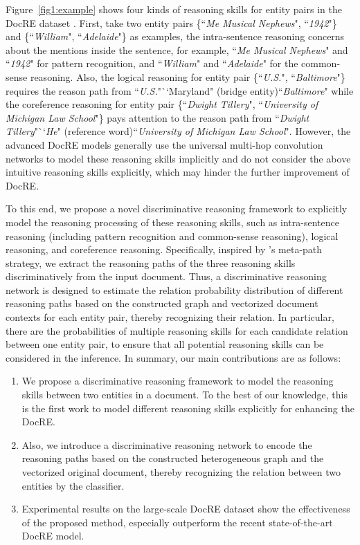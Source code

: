 \documentclass[11pt,a4paper]{article}
\begin{document}
Figure~\ref{fig1:example} shows four kinds of reasoning skills for entity pairs in the DocRE dataset \cite{yao-etal-2019-docred}.
First, take two entity pairs \{``\textit{Me Musical Nephews}", ``\textit{1942}"\} and \{``\textit{William}", ``\textit{Adelaide}"\} as examples, the intra-sentence reasoning concerns about the mentions inside the sentence, for example, ``\textit{Me Musical Nephews}" and ``\textit{1942}" for pattern recognition, and ``\textit{William}" and ``\textit{Adelaide}" for the common-sense reasoning.
Also, the logical reasoning for entity pair \{``\textit{U.S.}", ``\textit{Baltimore}"\} requires the reason path from ``\textit{U.S.}"``Maryland" (bridge entity)``\textit{Baltimore}" while the coreference reasoning for entity pair \{``\textit{Dwight Tillery}", ``\textit{University of Michigan Law School}"\} pays attention to the reason path from ``\textit{Dwight Tillery}"``\textit{He}" (reference word)``\textit{University of Michigan Law School}".
However, the advanced DocRE models generally use the universal multi-hop convolution networks to model these reasoning skills implicitly and do not consider the above intuitive reasoning skills explicitly, which may hinder the further improvement of DocRE.

To this end, we propose a novel discriminative reasoning framework to explicitly model the reasoning processing of these reasoning skills, such as intra-sentence reasoning (including pattern recognition and common-sense reasoning), logical reasoning, and coreference reasoning.
Specifically, inspired by \citeauthor{docred-rec}'s meta-path strategy, we extract the reasoning paths of the three reasoning skills discriminatively from the input document.
Thus, a discriminative reasoning network is designed to estimate the relation probability distribution of different reasoning paths based on the constructed graph and vectorized document contexts for each entity pair, thereby recognizing their relation.
In particular, there are the probabilities of multiple reasoning skills for each candidate relation between one entity pair, to ensure that all potential reasoning skills can be considered in the inference.
In summary, our main contributions are as follows:
\begin{enumerate}
\item[] 
We propose a discriminative reasoning framework to model the reasoning skills between two entities in a document. 
To the best of our knowledge, this is the first work to model different reasoning skills explicitly for enhancing the DocRE.
\item[]
Also, we introduce a discriminative reasoning network to encode the reasoning paths based on the constructed heterogeneous graph and the vectorized original document, thereby recognizing the relation between two entities by the classifier.
\item[]
Experimental results on the large-scale DocRE dataset show the effectiveness of the proposed method, especially outperform the recent state-of-the-art DocRE model.
\end{enumerate}
\end{document}
